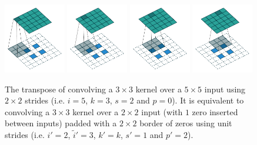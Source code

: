 \documentclass{report}
\begin{document}
\begin{figure}[p]
    \centering
    \includegraphics[width=0.24\textwidth]{pdf/no_padding_strides_transposed_00.pdf}
    \includegraphics[width=0.24\textwidth]{pdf/no_padding_strides_transposed_01.pdf}
    \includegraphics[width=0.24\textwidth]{pdf/no_padding_strides_transposed_02.pdf}
    \includegraphics[width=0.24\textwidth]{pdf/no_padding_strides_transposed_03.pdf}
    \caption{\label{fig:no_padding_strides_transposed} The transpose of
        convolving a $3 \times 3$ kernel over a $5 \times 5$ input using $2
        \times 2$ strides (i.e. $i = 5$, $k = 3$, $s = 2$ and $p = 0$). It is
        equivalent to convolving a $3 \times 3$ kernel over a $2 \times 2$ input
        (with $1$ zero inserted between inputs) padded with a $2 \times 2$
        border of zeros using unit strides (i.e. $i' = 2$, $\tilde{i}' = 3$, $k'
        = k$, $s' = 1$ and $p' = 2$).}
\end{figure}
\end{document}
